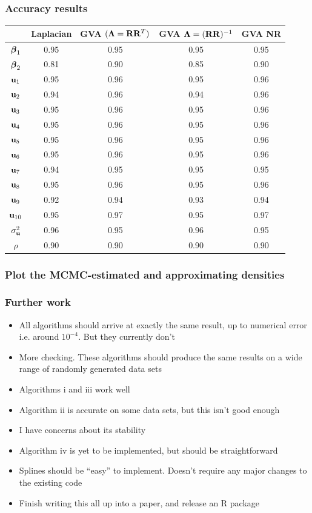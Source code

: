 \documentclass{beamer}
\begin{document}
\begin{frame}
\frametitle{Accuracy results}
\begin{tabular}{ccccc}
\hline
	& Laplacian & GVA $({\boldsymbol \Lambda}={\bf R} {\bf R}^T)$ & GVA ${\boldsymbol \Lambda}=({\bf R} {\bf R})^{-1}$ & GVA NR \\
\hline
${\boldsymbol \beta}_1$&0.95&0.95&0.95&0.95 \\
${\boldsymbol \beta}_2$&0.81&0.90&0.85&0.90 \\
${\bf u}_1$&0.95&0.96&0.95&0.96 \\
${\bf u}_2$&0.94&0.96&0.94&0.96 \\
${\bf u}_3$&0.95&0.96&0.95&0.96 \\
${\bf u}_4$&0.95&0.96&0.95&0.96 \\
${\bf u}_5$&0.95&0.96&0.95&0.96 \\
${\bf u}_6$&0.95&0.96&0.95&0.96 \\
${\bf u}_7$&0.94&0.95&0.95&0.95 \\
${\bf u}_8$&0.95&0.96&0.95&0.96 \\
${\bf u}_9$&0.92&0.94&0.93&0.94 \\
${\bf u}_{10}$&0.95&0.97&0.95&0.97 \\
$\sigma_{\bf u}^2$&0.96&0.95&0.96&0.95 \\
$\rho$&0.90&0.90&0.90&0.90 \\
\hline
\end{tabular}
\end{frame}

\begin{frame}
\frametitle{Plot the MCMC-estimated and approximating densities}
\end{frame}

\begin{frame}
\frametitle{Further work}
\begin{itemize}
\item All algorithms should arrive at exactly the same result, up to numerical error i.e. around $10^{-4}$. But they currently don't
\item More checking. These algorithms should produce the same results on
a wide range of randomly generated data sets
\item Algorithms i and iii work well
\item Algorithm ii is accurate on some data sets, but this isn't good enough
\item I have concerns about its stability
\item Algorithm iv is yet to be implemented, but should be straightforward
\item Splines should be ``easy'' to implement. Doesn't require any major changes to the existing code
\item Finish writing this all up into a paper, and release an R package
\end{itemize}
\end{frame}
\end{document}

